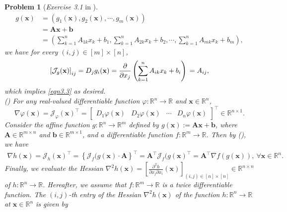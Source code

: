 \documentclass[11pt]{article}
\newtheorem{problem}{Problem}
\begin{document}
\begin{problem} [\emph{Exercise 3.1} in \cite{calafiore2014optimization}]
{\begin{equation*}
    \begin{split}
        g(\mathbf{x}) &= \left( g_1 (\mathbf{x}), g_2 (\mathbf{x}), \cdots, g_m (\mathbf{x}) \right) \\
        &= \mathbf{A} \mathbf{x} + \mathbf{b} \\
        &= \left( \sum_{k=1}^{n} A_{1k} x_k + b_1, \sum_{k=1}^{n} A_{2k} x_k + b_2, \cdots, \sum_{k=1}^{n} A_{mk} x_k + b_m \right),
    \end{split}
\end{equation*}
we have for every $(i, j) \in [m] \times [n]$,
\begin{equation*}
    \left[ \mathcal{J}_g (\mathbf{x}) \right]_{ij} 
    = D_j g_i (\mathbf{x}) \\
    = \frac{\partial}{\partial x_j} \left( \sum_{k=1}^{n} A_{ik} x_k + b_i \right) \\
    = A_{ij},
\end{equation*}
which implies \eqref{eqn3.3} as desired. \\ [10pt]
\indent () For any real-valued differentiable function $\varphi : \mathbb{R}^n \rightarrow \mathbb{R}$ and $\mathbf{x} \in \mathbb{R}^n$,
\begin{equation*}
    \nabla \varphi (\mathbf{x}) = \mathcal{J}_{\varphi}(\mathbf{x})^{\top} 
    = 
    \begin{bmatrix}
        D_1 \varphi (\mathbf{x}) & D_2 \varphi (\mathbf{x}) & \cdots
        & D_n \varphi (\mathbf{x})
    \end{bmatrix}^{\top}
    \in \mathbb{R}^{n \times 1}.
\end{equation*}
Consider the affine function $g : \mathbb{R}^n \rightarrow \mathbb{R}^m$ defined by $g(\mathbf{x}) := \mathbf{A} \mathbf{x} + \mathbf{b}$, where $\mathbf{A} \in \mathbb{R}^{m \times n}$ and $\mathbf{b} \in \mathbb{R}^{m \times 1}$, and a differentiable function $f : \mathbb{R}^m \rightarrow \mathbb{R}$. Then by (), we have
\begin{equation}
    \label{eqn3.4}
    \begin{split}
        \nabla h(\mathbf{x}) = \mathcal{J}_h (\mathbf{x})^{\top}
        = \left\{ \mathcal{J}_f (g(\mathbf{x}) \cdot \mathbf{A} \right\}^{\top}
        = \mathbf{A}^{\top} \mathcal{J}_f (g(\mathbf{x})^{\top} 
        = \mathbf{A}^{\top} \nabla f \left( g (\mathbf{x}) \right),\ \forall \mathbf{x} \in \mathbb{R}^n.
    \end{split}
\end{equation}
\indent Finally, we evaluate the Hessian $\nabla^2 h(\mathbf{x}) = \left[ \frac{\partial^2 h}{\partial x_j \partial x_i} (\mathbf{x}) \right]_{(i, j) \in [n] \times [n]} \in \mathbb{R}^{n \times n}$ of $h : \mathbb{R}^n \rightarrow \mathbb{R}$. Hereafter, we assume that $f : \mathbb{R}^m \rightarrow \mathbb{R}$ is a twice differentiable function. The $(i, j)$-th entry of the Hessian $\nabla^2 h(\mathbf{x})$ of the function $h : \mathbb{R}^n \rightarrow \mathbb{R}$ at $\mathbf{x} \in \mathbb{R}^n$ is given by
}
\end{problem}
\end{document}
